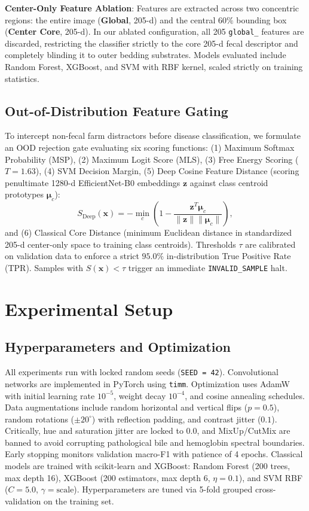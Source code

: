 \documentclass[conference]{IEEEtran}
\begin{document}
\textbf{Center-Only Feature Ablation}: Features are extracted across two concentric regions: the entire image (\textbf{Global}, 205-d) and the central $60\%$ bounding box (\textbf{Center Core}, 205-d). In our ablated configuration, all 205 \texttt{global\_} features are discarded, restricting the classifier strictly to the core 205-d fecal descriptor and completely blinding it to outer bedding substrates. Models evaluated include Random Forest, XGBoost, and SVM with RBF kernel, scaled strictly on training statistics.

\subsection{Out-of-Distribution Feature Gating}
To intercept non-fecal farm distractors before disease classification, we formulate an OOD rejection gate evaluating six scoring functions: (1) Maximum Softmax Probability (MSP), (2) Maximum Logit Score (MLS), (3) Free Energy Scoring ($T=1.63$), (4) SVM Decision Margin, (5) Deep Cosine Feature Distance (scoring penultimate 1280-d EfficientNet-B0 embeddings $\mathbf{z}$ against class centroid prototypes $\boldsymbol{\mu}_c$):
\begin{equation}
S_{\text{Deep}}(\mathbf{x}) = - \min_{c} \left( 1 - \frac{\mathbf{z}^T \boldsymbol{\mu}_c}{\|\mathbf{z}\| \|\boldsymbol{\mu}_c\|} \right),
\label{eq:deep_ood}
\end{equation}
and (6) Classical Core Distance (minimum Euclidean distance in standardized 205-d center-only space to training class centroids). Thresholds $\tau$ are calibrated on validation data to enforce a strict $95.0\%$ in-distribution True Positive Rate (TPR). Samples with $S(\mathbf{x}) < \tau$ trigger an immediate \texttt{INVALID\_SAMPLE} halt.

\section{Experimental Setup}

\subsection{Hyperparameters and Optimization}
All experiments run with locked random seeds (\texttt{SEED = 42}). Convolutional networks are implemented in PyTorch using \texttt{timm}. Optimization uses AdamW with initial learning rate $10^{-5}$, weight decay $10^{-4}$, and cosine annealing schedules. Data augmentations include random horizontal and vertical flips ($p=0.5$), random rotations ($\pm 20^\circ$) with reflection padding, and contrast jitter ($0.1$). Critically, hue and saturation jitter are locked to 0.0, and MixUp/CutMix are banned to avoid corrupting pathological bile and hemoglobin spectral boundaries. Early stopping monitors validation macro-F1 with patience of 4 epochs. Classical models are trained with scikit-learn and XGBoost: Random Forest (200 trees, max depth 16), XGBoost (200 estimators, max depth 6, $\eta=0.1$), and SVM RBF ($C=5.0$, $\gamma=\text{scale}$). Hyperparameters are tuned via 5-fold grouped cross-validation on the training set.
\end{document}
